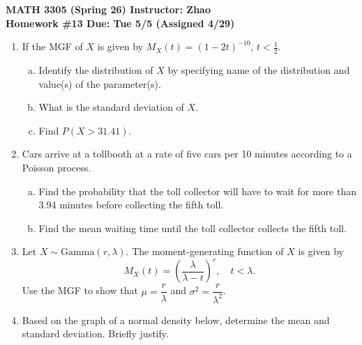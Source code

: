 \documentclass[12pt]{article}
\begin{document}
\begin{center}
  \textbf{\large MATH 3305 (Spring 26) \hfill Instructor: Zhao}\\[4pt]
  \textbf{\large Homework \#13 \hfill Due: Tue 5/5 (Assigned 4/29)}
\end{center}

\bigskip

\begin{enumerate}
  \item If the MGF of $X$ is given by $M_X(t) = (1 - 2t)^{-10}$, $t < \tfrac{1}{2}$.
    \begin{enumerate}[(a)]
      \item Identify the distribution of $X$ by specifying name of the distribution and value(s) of the parameter(s).
      \item What is the standard deviation of $X$.
      \item Find $P(X > 31.41)$.
    \end{enumerate}

  \newpage
  \item Cars arrive at a tollbooth at a rate of five cars per 10 minutes according to a Poisson process.
    \begin{enumerate}[(a)]
      \item Find the probability that the toll collector will have to wait for more than $3.94$ minutes before collecting the fifth toll.
      \item Find the mean waiting time until the toll collector collects the fifth toll.
    \end{enumerate}

  \newpage
  \item Let $X \sim \mathrm{Gamma}(r, \lambda)$. The moment-generating function of $X$ is given by
    \[
      M_X(t) = \left(\frac{\lambda}{\lambda - t}\right)^{r}, \quad t < \lambda.
    \]
    Use the MGF to show that $\mu = \dfrac{r}{\lambda}$ and $\sigma^2 = \dfrac{r}{\lambda^2}$.

  \newpage
  \item Based on the graph of a normal density below, determine the mean and standard deviation. Briefly justify.

    \begin{center}
    \end{center}


\end{enumerate}
\end{document}

